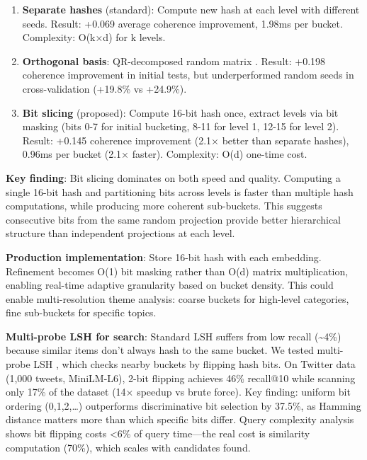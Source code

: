 \documentclass[
]{article}
\begin{document}
\begin{enumerate}
\def\labelenumi{\arabic{enumi}.}
\item
  \textbf{Separate hashes} (standard): Compute new hash at each level
  with different seeds. Result: +0.069 average coherence improvement,
  1.98ms per bucket. Complexity: O(k×d) for k levels.
\item
  \textbf{Orthogonal basis}: QR-decomposed random matrix
  \autocite{ji2012superbit}. Result: +0.198 coherence improvement in
  initial tests, but underperformed random seeds in cross-validation
  (+19.8\% vs +24.9\%).
\item
  \textbf{Bit slicing} (proposed): Compute 16-bit hash once, extract
  levels via bit masking (bits 0-7 for initial bucketing, 8-11 for level
  1, 12-15 for level 2). Result: +0.145 coherence improvement (2.1×
  better than separate hashes), 0.96ms per bucket (2.1× faster).
  Complexity: O(d) one-time cost.
\end{enumerate}

\textbf{Key finding}: Bit slicing dominates on both speed and quality.
Computing a single 16-bit hash and partitioning bits across levels is
faster than multiple hash computations, while producing more coherent
sub-buckets. This suggests consecutive bits from the same random
projection provide better hierarchical structure than independent
projections at each level.

\textbf{Production implementation}: Store 16-bit hash with each
embedding. Refinement becomes O(1) bit masking rather than O(d) matrix
multiplication, enabling real-time adaptive granularity based on bucket
density. This could enable multi-resolution theme analysis: coarse
buckets for high-level categories, fine sub-buckets for specific topics.

\textbf{Multi-probe LSH for search}: Standard LSH suffers from low
recall (\textasciitilde4\%) because similar items don't always hash to
the same bucket. We tested multi-probe LSH \autocite{lv2007multiprobe},
which checks nearby buckets by flipping hash bits. On Twitter data
(1,000 tweets, MiniLM-L6), 2-bit flipping achieves 46\% recall@10 while
scanning only 17\% of the dataset (14× speedup vs brute force). Key
finding: uniform bit ordering (0,1,2,\ldots) outperforms discriminative
bit selection by 37.5\%, as Hamming distance matters more than which
specific bits differ. Query complexity analysis shows bit flipping costs
\textless6\% of query time---the real cost is similarity computation
(70\%), which scales with candidates found.
\end{document}
